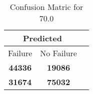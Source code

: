 \begin{table}[] 
\caption{Confusion Matric for 70.0} 
\label{Table: Prediction Accuracy-None70.0DecisionTrees100EKF-ignoresolarPanelDipole-solarPanelDipole} 
\centering 
\begin{tabular} 
 {@{}ccc@{}} 
\toprule 
\multicolumn{2}{c}{\textbf{Predicted}}
 \\ \midrule 
\multicolumn{1}{|c|}{Failure} & 
\multicolumn{1}{c|}{No Failure}
 \\ \midrule 
\multicolumn{1}{|c|}{\color{green}\textbf{44336}} & 
\multicolumn{1}{c|}{\color{red}\textbf{19086}}
 \\ \midrule 
\multicolumn{1}{|c|}{\color{red}\textbf{31674}} & 
\multicolumn{1}{c|}{\color{green}\textbf{75032}}
 \\ \bottomrule 
\end{tabular} 
\end{table} 
